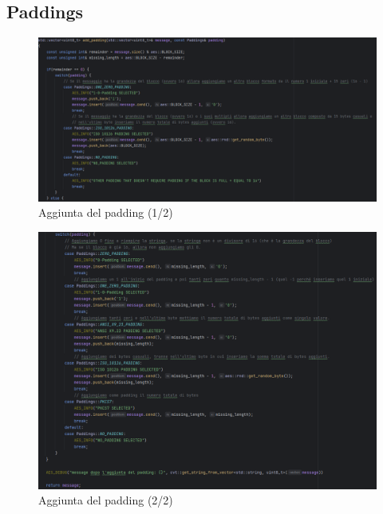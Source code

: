 \subsection{Paddings}

\textsf{\small } %

\begin{figure}[H]
	\centering
	\includegraphics[width=1\textwidth, height=1\textheight, keepaspectratio]{./images/code/cpp/padding/add_padding0.PNG}
	\caption{Aggiunta del padding (1/2)}
	\label{fig:add_padding0}
\end{figure}

\begin{figure}[H]
	\centering
	\includegraphics[width=1\textwidth, height=1\textheight, keepaspectratio]{./images/code/cpp/padding/add_padding1.PNG}
	\caption{Aggiunta del padding (2/2)}
	\label{fig:add_padding1}
\end{figure}

\textsf{\small }

